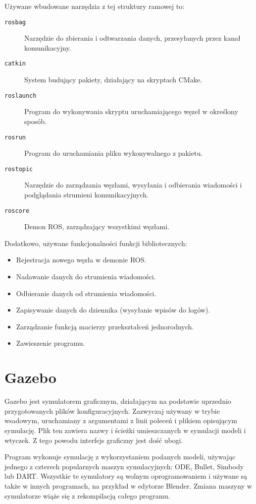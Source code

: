 	Używane wbudowane narzędzia z tej struktury ramowej to:
	\begin{description}
		\item[\texttt{rosbag}] Narzędzie do zbierania i odtwarzania danych, przesyłanych przez kanał komunikacyjny.
		\item[\texttt{catkin}] System budujący pakiety, działający na skryptach CMake.
		\item[\texttt{roslaunch}] Program do wykonywania skryptu uruchamiającego węzeł w określony sposób.
		\item[\texttt{rosrun}] Program do uruchamiania pliku wykonywalnego z pakietu.
		\item[\texttt{rostopic}] Narzędzie do zarządzania węzłami, wysyłania i odbierania wiadomości i podglądania strumieni komunikacyjnych.
		\item[\texttt{roscore}] Demon ROS, zarządzający wszystkimi węzłami.
	\end{description}
	Dodatkowo, używane funkcjonalności funkcji bibliotecznych:
	\begin{itemize}
		\item Rejestracja nowego węzła w demonie ROS.
		\item Nadawanie danych do strumienia wiadomości.
		\item Odbieranie danych od strumienia wiadomości.
		\item Zapisywanie danych do dziennika (wysyłanie wpisów do logów).
		\item Zarządzanie funkcją macierzy przekształceń jednorodnych.
		\item Zawieszenie programu.
	\end{itemize}


\section{Gazebo}
	Gazebo \cite{gazebo_website} jest symulatorem graficznym, działającym na podstawie uprzednio przygotowanych plików konfiguracyjnych.
	Zazwyczaj używany w trybie wsadowym, uruchamiany z argumentami z linii poleceń i plikiem opisującym symulację.
	Plik ten zawiera nazwy i ścieżki umieszczanych w symulacji modeli i wtyczek.
	Z tego powodu interfejs graficzny jest dość ubogi.

	Program wykonuje symulację z wykorzystaniem podanych modeli, używając jednego z czterech popularnych maszyn symulacyjnych: ODE, Bullet, Simbody lub DART.
	Wszystkie te symulatory są wolnym oprogramowaniem i używane są także w innych programach, na przykład w edytorze Blender.
	Zmiana maszyny w symulatorze wiąże się z rekompilacją całego programu.

